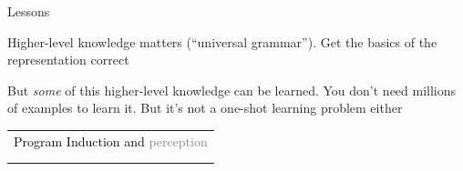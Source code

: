 \documentclass{beamer}
\begin{document}
\begin{frame}{Lessons}

  Higher-level knowledge matters (``universal grammar''). Get the basics of the representation correct

  \vspace{1cm}

  But \emph{some} of this higher-level knowledge can be learned. You don't need millions of examples to learn it. But it's not a one-shot learning problem either

\end{frame}

\begin{frame}{}
  \begin{center}
    \begin{tabular}{l}
      {\textcolor{black}{Program Induction and }\textcolor{gray}{perception}}\\
      \phantom{Program Induction and }{\textcolor{gray}{model discovery}}\\
      \phantom{Program Induction and }{\textcolor{black}{learning to learn}}
      \end{tabular}
  \end{center}
\end{frame}
\end{document}
